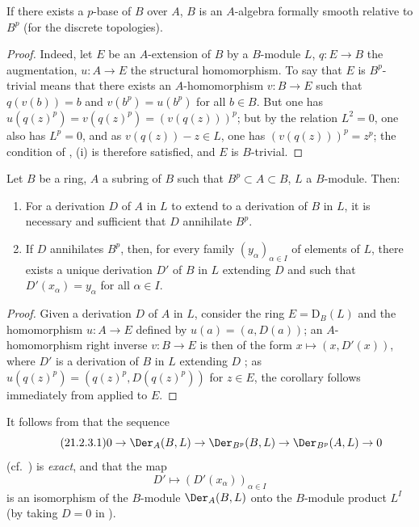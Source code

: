 \begin{corollary}[21.2.2]
\label{0.21.2.2}
If there exists a $p$-base of $B$ over $A$, $B$ is an $A$-algebra formally smooth relative to $B^p$ \textup{(}for the discrete topologies\textup{)}.
\end{corollary}

\begin{proof}
Indeed, let $E$ be an $A$-extension of $B$ by a $B$-module $L$, $q:E\to B$ the augmentation, $u:A\to E$ the structural homomorphism.
To say that $E$ is $B^p$-trivial means that there exists an $A$-homomorphism $v:B\to E$ such that $q(v(b))=b$ and $v(b^p)=u(b^p)$ for all $b\in B$.
But one has $u(q(z)^p)=v(q(z)^p)=(v(q(z)))^p$; but by the relation $L^2=0$, one also has $L^p=0$, and as $v(q(z))-z\in L$, one has $(v(q(z)))^p=z^p$; the condition of , (i) is therefore satisfied, and $E$ is $B$-trivial.
\end{proof}

\begin{corollary}[21.2.3]
\label{0.21.2.3}
Let $B$ be a ring, $A$ a subring of $B$ such that $B^p\subset A\subset B$, $L$ a $B$-module.
Then:
\begin{enumerate}
  \item[\rm(i)] For a derivation $D$ of $A$ in $L$ to extend to a derivation of $B$ in $L$, it is necessary and sufficient that $D$ annihilate $B^p$.
  \item[\rm(ii)] If $D$ annihilates $B^p$, then, for every family $(y_\alpha)_{\alpha\in I}$ of elements of $L$, there exists a unique derivation $D'$ of $B$ in $L$ extending $D$ and such that $D'(x_\alpha)=y_\alpha$ for all $\alpha\in I$.
\end{enumerate}
\end{corollary}

\begin{proof}
Given a derivation $D$ of $A$ in $L$, consider the ring $E=\mathrm{D}_B(L)$ and the homomorphism $u:A\to E$ defined by $u(a)=(a,D(a))$; an $A$-homomorphism right inverse $v:B\to E$ is then of the form $x\mapsto(x,D'(x))$, where $D'$ is a derivation of $B$ in $L$ extending $D$ ; as $u(q(z)^p)=(q(z)^p,D(q(z)^p))$ for $z\in E$, the corollary follows immediately from  applied to $E$.
\end{proof}

It follows from  that the sequence
\begin{equation}
\tag{21.2.3.1}
  \label{0.21.2.3.1}
  0\to\Der_A(B,L)\to\Der_{B^p}(B,L)\to\Der_{B^p}(A,L)\to 0
\end{equation}
(cf.\ ) is \emph{exact}, and that the map
\begin{equation}
\tag{21.2.3.2}
  \label{0.21.2.3.2}
  D'\mapsto(D'(x_\alpha))_{\alpha\in I}
\end{equation}
is an isomorphism of the $B$-module $\Der_A(B,L)$ onto the $B$-module product $L^I$ (by taking $D=0$ in ).

